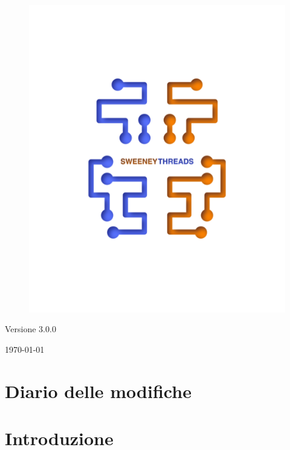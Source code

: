 \documentclass[a4paper]{article}
\begin{document}
\begin{titlepage}
		\begin{figure}[H]
			\centering
			\includegraphics[scale=0.8]{sweeney.png}
		\end{figure}
		\begin{center}
			Versione 3.0.0
		\end{center}
		{\large \today} \\ [3cm] 
		\vfill  
	\end{titlepage}
	
	
	\tableofcontents
	
	\newpage 
	\section*{Diario delle modifiche}

	\newpage \section{Introduzione}
\end{document}
